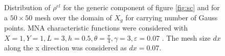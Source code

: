 \begin{figure}[!ht]
    \quad
    \caption{Distribution of $ \rho^{el}$ for the generic component of figure \ref{fig:sc} and for a $50\times50$ mesh over the domain of $X_g$ for carrying number of Gauss points.  MNA characteristic functions were considered with $X=1,Y=1,L=3,h=0.5,\theta=\frac{\pi}{4}, \gamma=3, \varepsilon=0.07$ . The mesh size $dx$ along the x direction was considered as $dx=0.07$. }%
    \label{fig:MNAv234}%
\end{figure}
